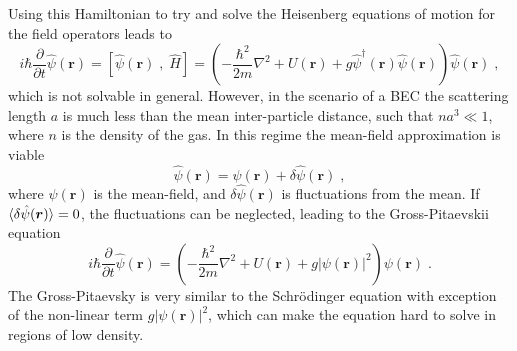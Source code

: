 Using this Hamiltonian to try and solve the Heisenberg equations of motion for the field operators leads to
\begin{equation}
	i \hbar \frac{\partial }{\partial t} \hat{\psi}(\boldsymbol{r}) = \left[ \hat{\psi}(\boldsymbol{r}) \; , \; \hat{H}  \right] = \left( - \frac{\hbar^2}{2 m} \nabla^2 + U(\boldsymbol{r}) + g \hat{\psi}^{\dag}(\boldsymbol{r}) \hat{\psi}(\boldsymbol{r}) \right) \hat{\psi}(\boldsymbol{r}) \; ,
\end{equation}
which is not solvable in general. However, in the scenario of a BEC the scattering length $a$ is much less than the mean inter-particle distance, such that $n a^3 \ll 1$, where $n$ is the density of the gas. In this regime the mean-field approximation is viable
\begin{equation}
	\hat{\psi}(\boldsymbol{r}) = \psi(\boldsymbol{r}) + \delta \hat{\psi}(\boldsymbol{r}) \; ,
\end{equation}
where $\psi(\boldsymbol{r})$ is the mean-field, and $\delta \hat{\psi}(\boldsymbol{r})$ is fluctuations from the mean. If $\braket{\delta \hat{\psi}(\boldsymbol{r})} = 0$, the fluctuations can be neglected, leading to the Gross-Pitaevskii equation \cite{Gross1961,Pitaevskii}
\begin{equation}
	i \hbar \frac{\partial }{\partial t} \hat{\psi}(\boldsymbol{r}) = \left( - \frac{\hbar^2}{2 m} \nabla^2 + U(\boldsymbol{r}) + g |\psi(\boldsymbol{r})|^2 \right) \psi(\boldsymbol{r}) \; .
\end{equation}
The Gross-Pitaevsky is very similar to the Schrödinger equation with exception of the non-linear term $g |\psi(\boldsymbol{r})|^2$, which can make the equation hard to solve in regions of low density.


